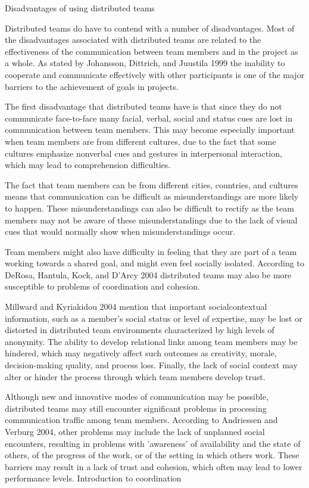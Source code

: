 Disadvantages of using distributed teams

Distributed teams do have to contend with a number of disadvantages. Most of the disadvantages associated with distributed teams are related to the effectiveness of the communication between team members and in the project as a whole. As stated by Johansson, Dittrich, and Juustila 1999 the inability to cooperate and communicate effectively with other participants is one of the major barriers to the achievement of goals in projects.

The first disadvantage that distributed teams have is that since they do not communicate face-to-face many facial, verbal, social and status cues are lost in communication between team members. This may become especially important when team members are from different cultures, due to the fact that some cultures emphasize nonverbal cues and gestures in interpersonal interaction, which may lead to comprehension difficulties.

The fact that team members can be from different cities, countries, and cultures means that communication can be difficult as misunderstandings are more likely to happen. These misunderstandings can also be difficult to rectify as the team members may not be aware of these misunderstandings due to the lack of visual cues that would normally show when misunderstandings occur.

Team members might also have difficulty in feeling that they are part of a team working towards a shared goal, and might even feel socially isolated. According to DeRosa, Hantula, Kock, and D'Arcy 2004 distributed teams may also be more susceptible to problems of coordination and cohesion.

Millward and Kyriakidou 2004 mention that important socialcontextual information, such as a member's social status or level of expertise, may be lost or distorted in distributed team environments characterized by high levels of anonymity. The ability to develop relational links among team members may be hindered, which may negatively affect such outcomes as creativity, morale, decision-making quality, and process loss. Finally, the lack of social context may alter or hinder the process through which team members develop trust.

Although new and innovative modes of communication may be possible, distributed teams may still encounter significant problems in processing communication traffic among team members. According to Andriessen and Verburg 2004, other problems may include the lack of unplanned social encounters, resulting in problems with 'awareness' of availability and the state of others, of the progress of the work, or of the setting in which others work. These barriers may result in a lack of trust and cohesion, which often may lead to lower performance levels.
Introduction to coordination

